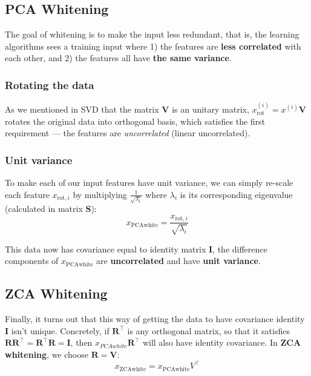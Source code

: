 \documentclass[a3paper, 12pt]{book} %
\begin{document}
\subsection{PCA Whitening}
The goal of whitening is to make the input less redundant, that is, the learning algorithms sees a training input where 1) the features are \textbf{less correlated} with each other, and 2) the features all have \textbf{the same variance}.

\subsubsection{Rotating the data}
As we mentioned in SVD that the matrix $\mathbf{V}$ is an unitary matrix, $x_{\mathrm{rot}}^{(i)}=x^{(i)}\mathbf{V}$ rotates the original data into orthogonal basis, which satisfies the first requirement --- the features are \emph{uncorrelated} (linear uncorrelated). 

\subsubsection{Unit variance}
To make each of our input features have unit variance, we can simply re-scale each feature $x_{\mathrm{rot},i}$ by multiplying $\frac{1}{\sqrt{\lambda_i}}$ where $\lambda_i$ is its corresponding eigenvalue (calculated in matrix $\mathbf{S}$):
\begin{equation}
x_{\mathrm{PCAwhite}}=\frac{x_{\mathrm{rot},i}}{\sqrt{\lambda_i}}
\end{equation}
 
This data now has covariance equal to identity matrix $\mathbf{I}$, the difference components of $x_{\mathrm{PCAwhite}}$ are \textbf{uncorrelated} and have \textbf{unit variance}.

\subsection{ZCA Whitening}
Finally, it turns out that this way of getting the data to have covariance identity $\mathbf{I}$ isn't unique. Concretely, if $\mathbf{R}^\top$ is any orthogonal matrix, so that it satisfies $\mathbf{R}\mathbf{R}^\top=\mathbf{R}^\top\mathbf{R}=\mathbf{I}$, then $x_{PCAwhite}\mathbf{R}^\top$ will also have identity covariance. In \textbf{ZCA whitening}, we choose $\mathbf{R}=\mathbf{V}$:
\begin{equation}
x_{\mathrm{ZCAwhite}}=x_{\mathrm{PCAwhite}}V^\top
\end{equation}
\end{document}
